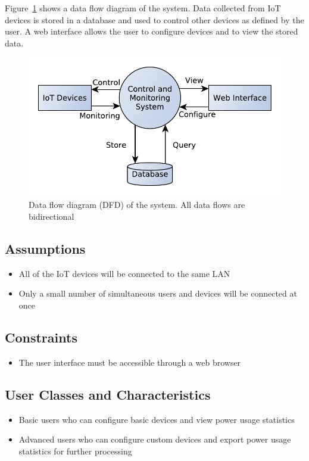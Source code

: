 \documentclass[11pt, a4paper]{article}
\begin{document}
	Figure~\ref{fig:dfd} shows a data flow diagram of the system. Data collected from IoT devices is stored in a database and used to control other devices as defined by the user. A web interface allows the user to configure devices and to view the stored data.
	\begin{figure}
		\includegraphics[width=\columnwidth]{data-flow-1}
		\caption{Data flow diagram (DFD) of the system. All data flows are bidirectional}
		\label{fig:dfd}
	\end{figure}
	
	\subsection{Assumptions}
	\begin{itemize}
		\item All of the IoT devices will be connected to the same LAN
		\item Only a small number of simultaneous users and devices will be connected at once
	\end{itemize}
	\subsection{Constraints}
	\begin{itemize}
		\item The user interface must be accessible through a web browser
	\end{itemize}
	
	\subsection{User Classes and Characteristics}
	\begin{itemize}
		\item Basic users who can configure basic devices and view power usage statistics
		\item Advanced users who can configure custom devices and export power usage statistics for further processing
	\end{itemize}
	
\end{document}
